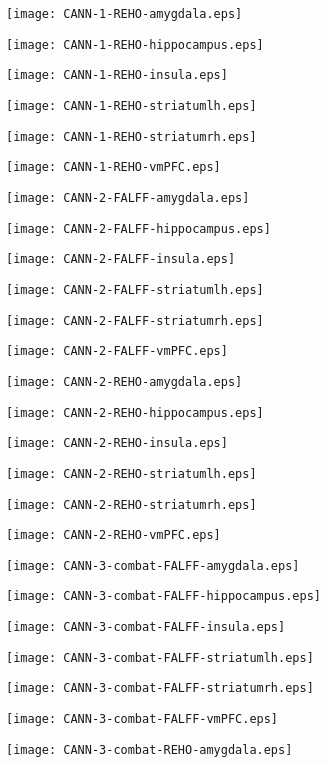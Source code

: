 \documentclass{article}
\begin{document}

\newpage
\texttt{[image: CANN-1-REHO-amygdala.eps]}

\newpage
\texttt{[image: CANN-1-REHO-hippocampus.eps]}

\newpage
\texttt{[image: CANN-1-REHO-insula.eps]}

\newpage
\texttt{[image: CANN-1-REHO-striatumlh.eps]}

\newpage
\texttt{[image: CANN-1-REHO-striatumrh.eps]}

\newpage
\texttt{[image: CANN-1-REHO-vmPFC.eps]}

\newpage
\texttt{[image: CANN-2-FALFF-amygdala.eps]}

\newpage
\texttt{[image: CANN-2-FALFF-hippocampus.eps]}

\newpage
\texttt{[image: CANN-2-FALFF-insula.eps]}

\newpage
\texttt{[image: CANN-2-FALFF-striatumlh.eps]}

\newpage
\texttt{[image: CANN-2-FALFF-striatumrh.eps]}

\newpage
\texttt{[image: CANN-2-FALFF-vmPFC.eps]}

\newpage
\texttt{[image: CANN-2-REHO-amygdala.eps]}

\newpage
\texttt{[image: CANN-2-REHO-hippocampus.eps]}

\newpage
\texttt{[image: CANN-2-REHO-insula.eps]}

\newpage
\texttt{[image: CANN-2-REHO-striatumlh.eps]}

\newpage
\texttt{[image: CANN-2-REHO-striatumrh.eps]}

\newpage
\texttt{[image: CANN-2-REHO-vmPFC.eps]}

\newpage
\texttt{[image: CANN-3-combat-FALFF-amygdala.eps]}

\newpage
\texttt{[image: CANN-3-combat-FALFF-hippocampus.eps]}

\newpage
\texttt{[image: CANN-3-combat-FALFF-insula.eps]}

\newpage
\texttt{[image: CANN-3-combat-FALFF-striatumlh.eps]}

\newpage
\texttt{[image: CANN-3-combat-FALFF-striatumrh.eps]}

\newpage
\texttt{[image: CANN-3-combat-FALFF-vmPFC.eps]}

\newpage
\texttt{[image: CANN-3-combat-REHO-amygdala.eps]}

\newpage
\end{document}
